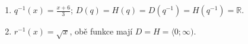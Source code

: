 \documentclass[11pt,a4paper]{article}
\begin{document}
\begin{zadaniReseniBox}[title={Domácí úkol}]
\begin{enumerate}[label=\alph*)]
$D(p)=\mathbb R\setminus\{-3\}$, $H(p)=\mathbb R\setminus\{2\}$; $D(p^{-1})=\mathbb R\setminus\{2\}$, $H(p^{-1})=\mathbb R\setminus\{-3\}$. Asymptoty $p$: $x=-3$, $y=2$; asymptoty $p^{-1}$: $x=2$, $y=-3$. Odpovídající body $[0;-\frac{1}{3}]\leftrightarrow[-\frac{1}{3};0]$.
\item $q^{-1}(x)=\frac{x+6}{3}$; $D(q)=H(q)=D(q^{-1})=H(q^{-1})=\mathbb R$.
\item $r^{-1}(x)=\sqrt x$, obě funkce mají $D=H=\langle0;\infty)$.
\end{enumerate}
\end{zadaniReseniBox}
\end{document}

